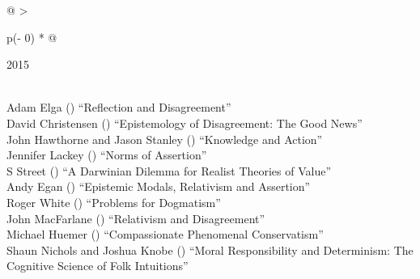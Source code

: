 \documentclass[
  10pt,
  letterpaper,
  DIV=11,
  numbers=noendperiod,
  twoside]{scrartcl}
\begin{document}
\begin{longtable}[]{@{}
  >{\raggedright\arraybackslash}p{(\columnwidth - 0\tabcolsep) * }@{}}

\caption{\label{tbl-top-ten-2006}Most cited articles published less than
ten years ago as of 2015.}

\tabularnewline

\toprule\noalign{}
\begin{minipage}[b]{\linewidth}\raggedright
2015
\end{minipage} \\
\midrule\noalign{}
\endhead
\bottomrule\noalign{}
\endlastfoot
Adam Elga
()
``Reflection and Disagreement'' \\
David Christensen
()
``Epistemology of Disagreement: The Good News'' \\
John Hawthorne and Jason Stanley
()
``Knowledge and Action'' \\
Jennifer Lackey
()
``Norms of Assertion'' \\
S Street
()
``A Darwinian Dilemma for Realist Theories of Value'' \\
Andy Egan
()
``Epistemic Modals, Relativism and Assertion'' \\
Roger White
()
``Problems for Dogmatism'' \\
John MacFarlane
()
``Relativism and Disagreement'' \\
Michael Huemer
()
``Compassionate Phenomenal Conservatism'' \\
Shaun Nichols and Joshua Knobe
()
``Moral Responsibility and Determinism: The Cognitive Science of Folk
Intuitions'' \\

\end{longtable}
\end{document}

